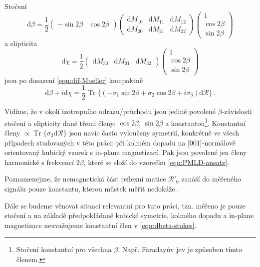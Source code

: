 Stočení
\begin{equation}
    \textrm{d}\beta = \frac{1}{2}\begin{pmatrix} -\sin2\beta&\cos2\beta \end{pmatrix} \begin{pmatrix} \textrm{d}M_{10}&\textrm{d}M_{11}&\textrm{d}M_{12}\\\textrm{d}M_{20}&\textrm{d}M_{21}&\textrm{d}M_{22} \end{pmatrix} \begin{pmatrix} 1\\\cos2\beta\\\sin2\beta \end{pmatrix}
\end{equation}
a elipticita
\begin{equation}
    \textrm{d}\chi = \frac{1}{2}\begin{pmatrix} \textrm{d}M_{30}&\textrm{d}M_{31}&\textrm{d}M_{32} \end{pmatrix} \begin{pmatrix} 1\\\cos2\beta\\\sin2\beta \end{pmatrix} 
\end{equation}
jsou po dosazení \eqref{eqn:dif-Mueller} kompaktně
\begin{equation}
    \label{eqn:dbeta-stokes}
    \textrm{d}\beta + i \textrm{d}\chi = \frac{1}{2} \operatorname{Tr} \lbrace \left( -\sigma_1\sin2\beta+\sigma_2\cos2\beta+i\sigma_3   \right) \textrm{d}\mathcal{R} \rbrace \,.
\end{equation}

Vidíme, že v okolí izotropního odrazu/průchodu jsou jediné povolené $\beta$-závislosti stočení a elipticity dané třemi členy: $\cos2\beta$, $\sin2\beta$ a konstantou\footnote{Stočení konstantní pro všechna $\beta$. Např. Faradayův jev je způsoben tímto členem.}.
Konstantní členy $\propto \operatorname{Tr}\lbrace \sigma_3 \textrm{d}\mathcal{R} \rbrace$ jsou navíc často vyloučeny symetrií, konkrétně ve všech případech studovaných v této práci: při kolmém dopadu na [001]-normálově orientovaný kubický vzorek s in-plane magnetizací.
Pak jsou povolené jen členy harmonické s frekvencí $2\beta$, které se složí do vzorečku \eqref{eqn:PMLD-ansatz}.

Poznamenejme, že nemagnetická část reflexní matice $\mathcal{R}'_0$ zanáší do měřeného signálu pouze konstantu, kterou můstek měřit nedokáže.

Dále se budeme věnovat situaci relevantní pro tuto práci, tzn. měřeno je pouze stočení a na základě předpokládané kubické symetrie, kolmého dopadu a in-plane magnetizace neuvažujeme konstantní člen v \eqref{eqn:dbeta-stokes}.

